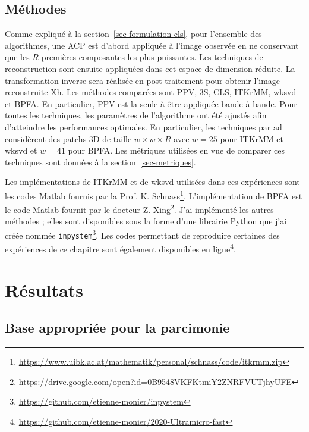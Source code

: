 \subsection{Méthodes}

Comme expliqué à la section~\ref{sec-formulation-cls}, pour l'ensemble des algorithmes, une ACP est d'abord appliquée à l'image observée en ne conservant que les $R$ premières composantes les plus puissantes. Les techniques de reconstruction sont ensuite appliquées dans cet espace de dimension réduite. La transformation inverse sera réalisée en post-traitement pour obtenir l'image reconstruite \gls{Xh}. Les méthodes comparées sont PPV, 3S, CLS, ITKrMM, \gls{wksvd} et BPFA. En particulier, PPV est la seule à être appliquée bande à bande. Pour toutes les techniques, les paramètres de l'algorithme ont été ajustés afin d'atteindre les performances optimales. En particulier, les techniques par \gls{ad} considèrent des patchs 3D de taille $w\times w \times R$ avec $w=25$ pour ITKrMM et \gls{wksvd} et $w=41$ pour BPFA. Les métriques utilisées en vue de comparer ces techniques sont données à la section~\ref{sec-metriques}.

Les implémentations de ITKrMM et de \gls{wksvd} utilisées dans ces expériences sont les codes Matlab fournis par la Prof. K. Schnass\footnote{\url{https://www.uibk.ac.at/mathematik/personal/schnass/code/itkrmm.zip}}. L'implémentation de BPFA est le code Matlab fournit par le docteur Z. Xing\footnote{\url{https://drive.google.com/open?id=0B9548VKFKtmiY2ZNRFVUTjhyUFE}}. J'ai implémenté les autres méthodes ;  elles sont disponibles sous la forme d'une librairie Python que j'ai créée nommée \texttt{inpystem}\footnote{\url{https://github.com/etienne-monier/inpystem}}. Les codes permettant de reproduire certaines des expériences de ce chapitre sont également disponibles en ligne\footnote{\url{https://github.com/etienne-monier/2020-Ultramicro-fast}}.



%
\section{Résultats}\label{sec-hr-results}

\subsection{Base appropriée pour la parcimonie}\label{sec-appropriate-basis}

